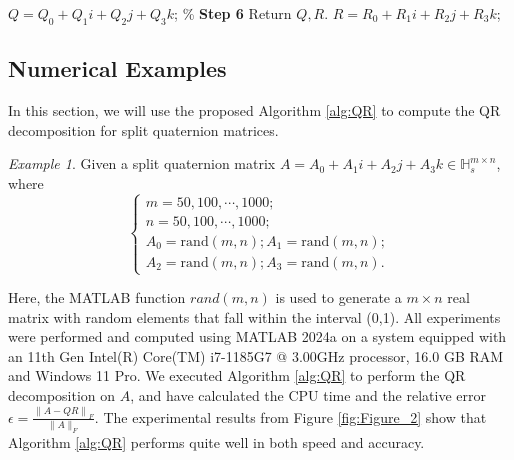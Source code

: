\documentclass{book}
\theoremstyle{remark}
\newtheorem{example}{\it\indent Example}[section]
\begin{document}
\begin{algorithm}[htbp]
\begin{algorithmic}[1]
        \State $Q = Q_0 + Q_1i + Q_2j + Q_3k$; \qquad\qquad\qquad\qquad\qquad\qquad\qquad\% \textbf{Step 6} Return $Q, R$.
        \State $R = R_0 + R_1i + R_2j + R_3k$;
    \End 
    \end{algorithmic}
\end{algorithm}
\begin{multicols}{2}


\section{Numerical Examples}

In this section, we will use the proposed Algorithm \ref{alg:QR} to compute the QR decomposition for split quaternion matrices.
\begin{example}
    Given a split quaternion matrix $A = A_{0}+A_{1}i+A_{2}j+A_{3}k\in \mathbb{H}_s^{m\times n}$, where
    \begin{equation}
       \begin{cases}
            m = 50,100,\cdots,1000;\\
            n = 50,100,\cdots,1000;  \\
            A_{0}=\text{rand}(m,n);
            A_{1}=\text{rand}(m,n); \\
            A_{2}=\text{rand}(m,n);
            A_{3}=\text{rand}(m,n).
        \end{cases} \label{eq:example2}
    \end{equation}
\end{example}
Here, the MATLAB function $rand(m,n)$ is used to generate a $m \times n$ real matrix with random elements that fall within the interval (0,1).  All experiments were performed and computed using MATLAB 2024a on a system equipped with an 11th Gen Intel(R) Core(TM) i7-1185G7 @ 3.00GHz processor, 16.0 GB RAM and Windows 11 Pro. We executed Algorithm \ref{alg:QR} to perform the QR decomposition on $A$, and have calculated the CPU time and the relative error
$\epsilon = \frac{\left\|A - Q R\right\|_{F}}{\|A\|_{F}}.$
The experimental results from Figure \ref{fig:Figure_2} show that Algorithm \ref{alg:QR} performs quite well in both speed and accuracy. 
\begin{figure}[H]
    \centering
    \begin{minipage}[b]{0.45\textwidth}
        \centering

\end{minipage}
\end{figure}
\end{multicols}
\end{document}
